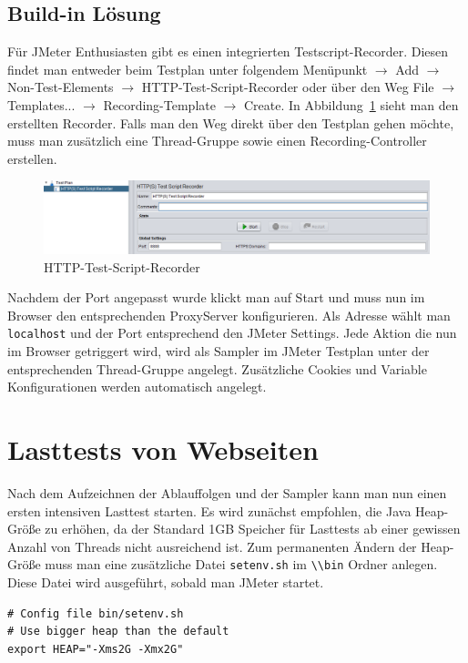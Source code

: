 \documentclass[a4paper,12pt]{article}
\newcommand{\codeInLine}[1]{%
\colorbox{graybackgroundColor}{\lstinline{#1}} %
}
\begin{document}
\subsection{Build-in Lösung}
Für JMeter Enthusiasten gibt es einen integrierten Testscript-Recorder. Diesen findet man entweder beim Testplan unter folgendem Menüpunkt $\rightarrow$ Add $\rightarrow$ Non-Test-Elements $\rightarrow$ HTTP-Test-Script-Recorder oder über den Weg File $\rightarrow$ Templates... $\rightarrow$ Recording-Template $\rightarrow$ Create.
In Abbildung~\ref{fig:https_recorder} sieht man den erstellten Recorder. Falls man den Weg direkt über den Testplan gehen möchte, muss man zusätzlich eine Thread-Gruppe sowie einen Recording-Controller erstellen.

\begin{figure}[htb]%
 \centering
    \includegraphics[width=1\textwidth]{bilder/https_recorder.png}
  \caption{HTTP-Test-Script-Recorder}
  \label{fig:https_recorder}
\end{figure}

Nachdem der Port angepasst wurde klickt man auf Start und muss nun im Browser den entsprechenden ProxyServer konfigurieren. Als Adresse wählt man \codeInLine{localhost} und der Port entsprechend den JMeter Settings. Jede Aktion die nun im Browser getriggert wird, wird als Sampler im JMeter Testplan unter der entsprechenden Thread-Gruppe angelegt. Zusätzliche Cookies und Variable Konfigurationen werden automatisch angelegt.

\section{Lasttests von Webseiten}
Nach dem Aufzeichnen der Ablauffolgen und der Sampler kann man nun einen ersten intensiven Lasttest starten. Es wird zunächst empfohlen, die Java Heap-Größe zu erhöhen, da der Standard 1GB Speicher für Lasttests ab einer gewissen Anzahl von Threads nicht ausreichend ist. Zum permanenten Ändern der Heap-Größe muss man eine zusätzliche Datei \codeInLine{setenv.sh} im \codeInLine{\\bin} Ordner anlegen. Diese Datei wird ausgeführt, sobald man JMeter startet. 

\begin{lstlisting}
# Config file bin/setenv.sh
# Use bigger heap than the default
export HEAP="-Xms2G -Xmx2G"
\end{lstlisting}
\end{document}
